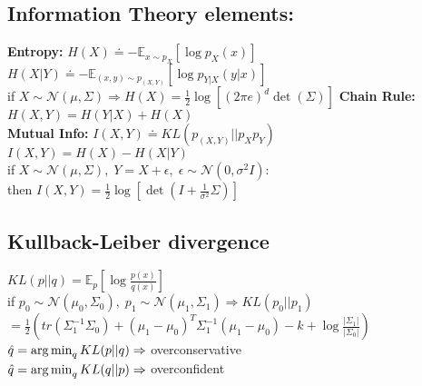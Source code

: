 \subsection{Information Theory elements:}
\textbf{Entropy:} $H(X)\doteq -\mathbb{E}_{x\sim p_X}\left[\log{p_X(x)}\right]$\\
$H(X\vert Y)\doteq -\mathbb{E}_{(x,y)\sim p_{(X,Y)}}\left[\log{p_{Y\vert X}(y\vert x)}\right]$\\
if $X\sim\mathcal{N}(\mu,\Sigma) \Rightarrow H(X) = \frac{1}{2}\log{\left[{(2\pi e)}^d \det{(\Sigma)}\right]}$
\textbf{Chain Rule:} $H(X, Y) = H(Y\vert X)+H(X)$\\
\textbf{Mutual Info:} $I(X, Y)\doteq KL(p_{(X,Y)}\vert\vert p_Xp_Y)$\\
$I(X, Y)=H(X)-H(X\vert Y)$\\
if $X\sim\mathcal{N}(\mu, \Sigma),\; Y=X+\epsilon, \; \epsilon\sim\mathcal{N}(0,\sigma^2 I)$:\\
then $I(X, Y)=\frac{1}{2}\log{\left[\det{(I+\frac{1}{\sigma^2}\Sigma)}\right]}$


\subsection{Kullback-Leiber divergence}
$KL(p\vert\vert q)=\mathbb{E}_p\left[\log\frac{p(x)}{q(x)}\right]$\\
if $p_0\sim \mathcal{N}(\mu_0,\Sigma_0),\; p_1\sim \mathcal{N}(\mu_1,\Sigma_1) \Rightarrow KL(p_0\vert\vert p_1)$\\
{\scriptsize$ = \frac{1}{2}\left(tr\left(\Sigma_1^{-1}\Sigma_0\right) + (\mu_1-\mu_0)^T\Sigma_1^{-1}(\mu_1-\mu_0)-k+\log\frac{\vert\Sigma_1\vert}{\vert\Sigma_0\vert}\right)$}\\
$\hat q = \operatorname*{arg\,min}_q KL(p\vert\vert q) \Rightarrow$ overconservative\\
$\hat q = \operatorname*{arg\,min}_q KL(q\vert\vert p) \Rightarrow$ overconfident
